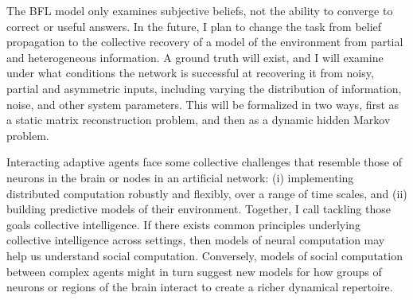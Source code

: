 \documentclass[]{article}
\begin{document}
The BFL model only examines subjective beliefs, not the ability to converge to correct or useful answers. In the future, I plan to change the task from belief propagation to the collective recovery of a model of the environment from partial and heterogeneous information. A ground truth will exist, and I will examine under what conditions the network is successful at recovering it from noisy, partial and asymmetric inputs, including varying the distribution of information, noise, and other system parameters. This will be formalized in two ways, first as a static matrix reconstruction problem, and then as a dynamic hidden Markov problem.

Interacting adaptive agents face some collective challenges that resemble those of neurons in the brain or nodes in an artificial network: (i) implementing distributed computation robustly and flexibly, over a range of time scales, and (ii) building predictive models of their environment. Together, I call tackling those goals collective intelligence. If there exists common principles underlying collective intelligence across settings, then models of neural computation may help us understand social computation. Conversely, models of social computation between complex agents might in turn suggest new models for how groups of neurons or regions of the brain interact to create a richer dynamical repertoire.

\printbibliography[heading=bibintoc, title={References}]
\end{document}
